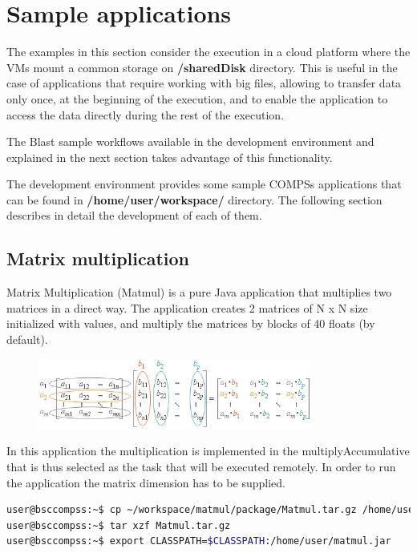\section{Sample applications}
\label{sec:SampleApps}

The examples in this section consider the execution in a cloud platform where the VMs mount a common storage on {\bf /sharedDisk} directory. This is useful in the case of applications that require working with big files, allowing to transfer data only once, at the beginning of the execution, and to enable the application to access the data directly during the rest of the execution.

The Blast sample workflows available in the development environment and explained in the next section takes advantage of this functionality.

The development environment provides some sample COMPSs applications that can be found in {\bf /home/user/workspace/} directory. The following section describes in detail the development of each of them.

\subsection{Matrix multiplication}
Matrix Multiplication (Matmul) is a pure Java application that multiplies two matrices in a direct way. The application creates 2 matrices of N x N size initialized with values, and multiply the matrices by blocks of 40 floats (by default).

\begin{figure}[ht!]
  \centering
    \includegraphics[width=0.8\textwidth]{./Sections/4_Sample_Apps/Figures/matrix.jpeg}
\end{figure}

In this application the multiplication is implemented in the multiplyAccumulative that is thus selected as the task that will be executed remotely. In order to run the application the matrix dimension has to be supplied.

\begin{lstlisting}[language=bash]
user@bsccompss:~$ cp ~/workspace/matmul/package/Matmul.tar.gz /home/user/
user@bsccompss:~$ tar xzf Matmul.tar.gz
user@bsccompss:~$ export CLASSPATH=$CLASSPATH:/home/user/matmul.jar
\end{lstlisting}

